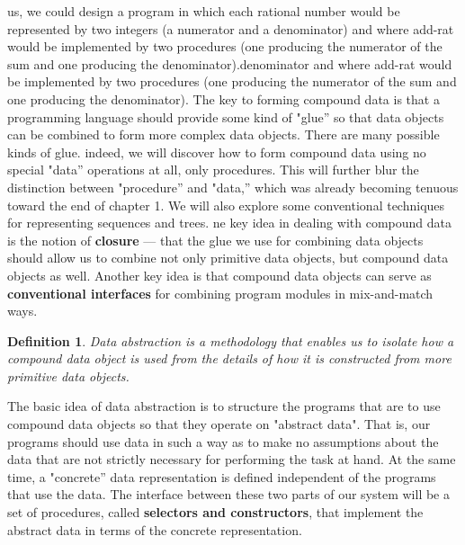 \documentclass[a4paper,twoside]{article}
\newtheorem{definition}[theorem]{Definition}
\numberwithin{equation}{section}
\begin{document}
us, we could design a program in which each rational number would be represented by two integers
(a numerator and a denominator) and where add-rat would be implemented by two procedures (one producing
the numerator of the sum and one producing the denominator).denominator and where add-rat would be
implemented by two procedures (one producing the numerator of the sum and one producing the denominator).
The key to forming compound data is that a programming language should provide some kind of "glue” so that
data objects can be combined to form more complex data objects. There are many possible kinds of glue.
indeed, we will discover how to form compound data using no special "data” operations at all, only procedures.
This will further blur the distinction between "procedure” and "data,” which was already becoming tenuous toward
the end of chapter 1. We will also explore some conventional techniques for representing sequences
and trees.
ne key idea in dealing with compound data is the notion of \textbf{closure} —
that the glue we use for combining data objects should allow
us to combine not only primitive data objects, but compound data objects as well. Another key idea
is that compound data objects can serve
as \textbf{conventional interfaces} for combining program modules in mix-and-match ways.
\begin{definition}
    Data abstraction is a methodology that enables us to isolate how a compound data object is used
    from the details of how it is constructed from more primitive data objects.
\end{definition}
The basic idea of data abstraction is to structure the programs that are to use compound data objects
so that they operate on "abstract data". That is, our programs should use data in such a way as to make no assumptions about the data that are not strictly necessary for performing the task at hand. At the same time, a "concrete” data representation is defined independent of the programs that use the data. The interface between these two parts of our system will be a set of procedures, called \textbf{selectors and constructors}, that implement the abstract data in terms of the concrete representation.
\end{document}
